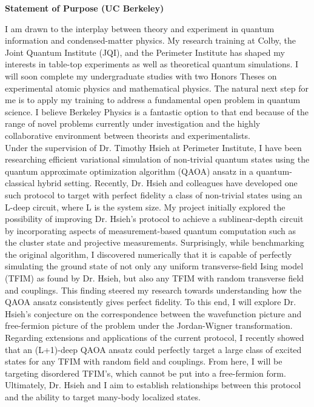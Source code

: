 \documentclass[12pt]{article}
\begin{document}
\begin{center}
	\textbf{Statement of Purpose (UC Berkeley)}
\end{center}
I am drawn to the interplay between theory and experiment in quantum information and condensed-matter physics. My research training at Colby, the Joint Quantum Institute (JQI), and the Perimeter Institute has shaped my interests in table-top experiments as well as theoretical quantum simulations. I will soon complete my undergraduate studies with two Honors Theses on experimental atomic physics and mathematical physics. The natural next step for me is to apply my training to address a fundamental open problem in quantum science. I believe Berkeley Physics is a fantastic option to that end because of the range of novel problems currently under investigation and the highly collaborative environment between theorists and experimentalists.   \\ 

Under the supervision of Dr. Timothy Hsieh at Perimeter Institute, I have been researching efficient variational simulation of non-trivial quantum states using the quantum approximate optimization algorithm (QAOA) ansatz in a quantum-classical hybrid setting. Recently, Dr. Hsieh and colleagues have developed one such protocol to target with perfect fidelity a class of non-trivial states using an L-deep circuit, where L is the system size. My project initially explored the possibility of improving Dr. Hsieh's protocol to achieve a sublinear-depth circuit by incorporating aspects of measurement-based quantum computation such as the cluster state and projective measurements. Surprisingly, while benchmarking the original algorithm, I discovered numerically that it is capable of perfectly simulating the ground state of not only any uniform transverse-field Ising model (TFIM) as found by Dr. Hsieh, but also any TFIM with random transverse field and couplings. This finding steered my research towards understanding how the QAOA ansatz consistently gives perfect fidelity. To this end, I will explore Dr. Hsieh's conjecture on the correspondence between the wavefunction picture and free-fermion picture of the problem under the Jordan-Wigner transformation. Regarding extensions and applications of the current protocol, I recently showed that an (L+1)-deep QAOA ansatz could perfectly target a large class of excited states for any TFIM with random field and couplings. From here, I will be targeting disordered TFIM's, which cannot be put into a free-fermion form. Ultimately, Dr. Hsieh and I aim to establish relationships between this protocol and the ability to target many-body localized states.\\
\end{document}
